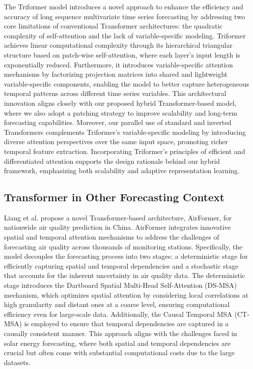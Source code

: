 \documentclass[12pt]{uomthesis}
\begin{document}
The Triformer model \cite{cirstea2022triformer} introduces a novel approach to enhance the efficiency and accuracy of long sequence multivariate time series forecasting by addressing two core limitations of conventional Transformer architectures: the quadratic complexity of self-attention and the lack of variable-specific modeling. Triformer achieves linear computational complexity through its hierarchical triangular structure based on patch-wise self-attention, where each layer's input length is exponentially reduced. Furthermore, it introduces variable-specific attention mechanisms by factorizing projection matrices into shared and lightweight variable-specific components, enabling the model to better capture heterogeneous temporal patterns across different time series variables. This architectural innovation aligns closely with our proposed hybrid Transformer-based model, where we also adopt a patching strategy to improve scalability and long-term forecasting capabilities. Moreover, our parallel use of standard and inverted Transformers complements Triformer's variable-specific modeling by introducing diverse attention perspectives over the same input space, promoting richer temporal feature extraction. Incorporating Triformer’s principles of efficient and differentiated attention supports the design rationale behind our hybrid framework, emphasizing both scalability and adaptive representation learning.

\subsection{Transformer in Other Forecasting Context}

Liang et al. \cite{liang2023airformer} propose a novel Transformer-based architecture, AirFormer, for nationwide air quality prediction in China. AirFormer integrates innovative spatial and temporal attention mechanisms to address the challenges of forecasting air quality across thousands of monitoring stations. Specifically, the model decouples the forecasting process into two stages: a deterministic stage for efficiently capturing spatial and temporal dependencies and a stochastic stage that accounts for the inherent uncertainty in air quality data. The deterministic stage introduces the Dartboard Spatial Multi-Head Self-Attention (DS-MSA) mechanism, which optimizes spatial attention by considering local correlations at high granularity and distant ones at a coarse level, ensuring computational efficiency even for large-scale data. Additionally, the Causal Temporal MSA (CT-MSA) is employed to ensure that temporal dependencies are captured in a causally consistent manner. This approach aligns with the challenges faced in solar energy forecasting, where both spatial and temporal dependencies are crucial but often come with substantial computational costs due to the large datasets. 
\end{document}
